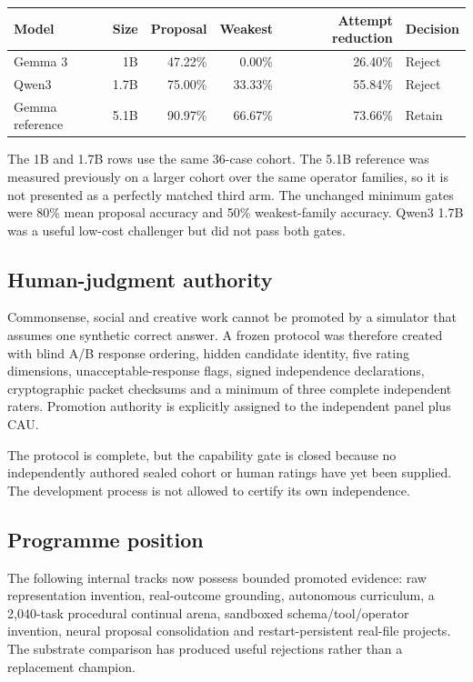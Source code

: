\begin{center}
\begin{tabular}{lrrrrl}
\hline
Model & Size & Proposal & Weakest & Attempt reduction & Decision \\
\hline
Gemma 3 & 1B & 47.22\% & 0.00\% & 26.40\% & Reject \\
Qwen3 & 1.7B & 75.00\% & 33.33\% & 55.84\% & Reject \\
Gemma reference & 5.1B & 90.97\% & 66.67\% & 73.66\% & Retain \\
\hline
\end{tabular}
\end{center}

The 1B and 1.7B rows use the same 36-case cohort.  The 5.1B reference was
measured previously on a larger cohort over the same operator families, so it
is not presented as a perfectly matched third arm.  The unchanged minimum gates
were 80\% mean proposal accuracy and 50\% weakest-family accuracy.  Qwen3 1.7B
was a useful low-cost challenger but did not pass both gates.

\subsection{Human-judgment authority}

Commonsense, social and creative work cannot be promoted by a simulator that
assumes one synthetic correct answer.  A frozen protocol was therefore created
with blind A/B response ordering, hidden candidate identity, five rating
dimensions, unacceptable-response flags, signed independence declarations,
cryptographic packet checksums and a minimum of three complete independent
raters.  Promotion authority is explicitly assigned to the independent panel
plus CAU.

The protocol is complete, but the capability gate is closed because no
independently authored sealed cohort or human ratings have yet been supplied.
The development process is not allowed to certify its own independence.

\subsection{Programme position}

The following internal tracks now possess bounded promoted evidence:
raw representation invention, real-outcome grounding, autonomous curriculum,
a 2,040-task procedural continual arena, sandboxed schema/tool/operator
invention, neural proposal consolidation and restart-persistent real-file
projects.  The substrate comparison has produced useful rejections rather than
a replacement champion.

